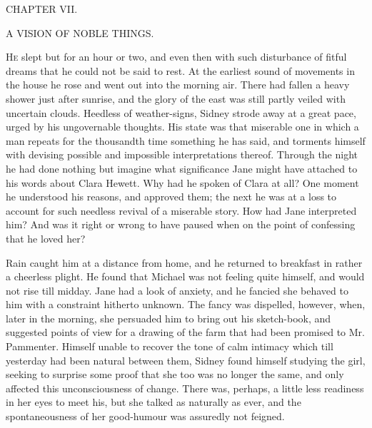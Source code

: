 {}

{CHAPTER VII.}

A VISION OF NOBLE THINGS.

\textsc{He} slept but for an hour or two, and even then with such
disturbance of fitful dreams that he could not be said to rest. At the
earliest sound of movements in the house he rose and went out into the
morning air. There had fallen a heavy shower just after sunrise, and the
glory of the east was still partly veiled with uncertain clouds.
Heedless of weather-signs, Sidney strode away at a great pace, urged by
his ungovernable thoughts. His state was that miserable one in which a
man repeats for the thousandth time something he has said, and torments
himself with devising possible and impossible interpretations thereof.
Through the night he had done nothing but imagine what significance Jane
might have attached to his words {}about Clara Hewett. Why had he spoken
of Clara at all? One moment he understood his reasons, and approved
them; the next he was at a loss to account for such needless revival of
a miserable story. How had Jane interpreted him? And was it right or
wrong to have paused when on the point of confessing that he loved her?

Rain caught him at a distance from home, and he returned to breakfast in
rather a cheerless plight. He found that Michael was not feeling quite
himself, and would not rise till midday. Jane had a look of anxiety, and
he fancied she behaved to him with a constraint hitherto unknown. The
fancy was dispelled, however, when, later in the morning, she persuaded
him to bring out his sketch-book, and suggested points of view for a
drawing of the farm that had been promised to Mr. Pammenter. Himself
unable to recover the tone of calm intimacy which till yesterday had
been natural between them, Sidney found himself studying the girl,
seeking to surprise some proof that she too was no longer the {}same,
and only affected this unconsciousness of change. There was, perhaps, a
little less readiness in her eyes to meet his, but she talked as
naturally as ever, and the spontaneousness of her good-humour was
assuredly not feigned.

